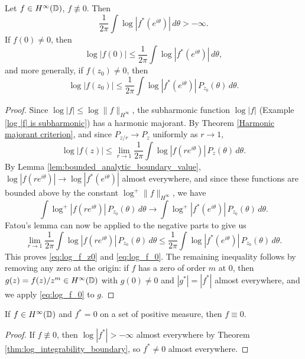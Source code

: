\begin{theorem}\label{thm:log_integrability_boundary}
Let $f\in H^\infty(\mathbb{D})$, $f\not\equiv 0$. Then
\begin{equation*}
  \frac{1}{2\pi}\int\log|f^*(e^{i\theta})|\,d\theta>-\infty.
\end{equation*}
If $f(0)\neq 0$, then
\begin{equation}\label{eq:log_f_0}
  \log|f(0)|\leq\frac{1}{2\pi}\int\log|f^*(e^{i\theta})|\,d\theta,
\end{equation}
and more generally, if $f(z_0)\neq 0$, then
\begin{equation}\label{eq:log_f_z0}
  \log|f(z_0)|\leq\frac{1}{2\pi}\int\log|f^*(e^{i\theta})|\,P_{z_0}(\theta)\,d\theta.
\end{equation}
\end{theorem}
\begin{proof}
Since $\log|f|\leq\log\|f\|_{H^\infty}$, the subharmonic function $\log|f|$
(Example \ref{log |f| is subharmonic}) has a harmonic majorant. By
Theorem \ref{Harmonic majorant criterion}, and since $P_{z/r}\rightarrow P_z$ uniformly as
$r\rightarrow 1$,
\begin{equation*}
  \log|f(z)|\leq\lim_{r\rightarrow 1}\frac{1}{2\pi}\int\log|f(re^{i\theta})|\,P_z(\theta)\,d\theta.
\end{equation*}
By Lemma \ref{lem:bounded_analytic_boundary_value}, $\log|f(re^{i\theta})|\rightarrow
\log|f^*(e^{i\theta})|$ almost everywhere, and since these functions are bounded above by the
constant $\log^+\|f\|_{H^\infty}$, we have
\begin{equation*}
  \int\log^+|f(re^{i\theta})|\,P_{z_0}(\theta)\,d\theta\rightarrow
  \int\log^+|f^*(e^{i\theta})|\,P_{z_0}(\theta)\,d\theta.
\end{equation*}
Fatou's lemma can now be applied to the negative parts to give us
\begin{equation*}
  \lim_{r\rightarrow 1}\frac{1}{2\pi}\int\log|f(re^{i\theta})|\,P_{z_0}(\theta)\,d\theta\leq
  \frac{1}{2\pi}\int\log|f^*(e^{i\theta})|\,P_{z_0}(\theta)\,d\theta.
\end{equation*}
This proves \eqref{eq:log_f_z0} and \eqref{eq:log_f_0}. The remaining inequality follows by
removing any zero at the origin: if $f$ has a zero of order $m$ at $0$, then
$g(z)=f(z)/z^m\in H^\infty(\mathbb{D})$ with $g(0)\neq 0$ and $|g^*|=|f^*|$ almost everywhere, and we
apply \eqref{eq:log_f_0} to $g$.
\end{proof}

\begin{corollary}\label{cor:boundary_uniqueness}
If $f\in H^\infty(\mathbb{D})$ and $f^*=0$ on a set of positive measure, then $f\equiv 0$.
\end{corollary}
\begin{proof}
If $f\not\equiv 0$, then $\log|f^*|>-\infty$ almost everywhere by
Theorem \ref{thm:log_integrability_boundary}, so $f^*\neq 0$ almost everywhere.
\end{proof}

